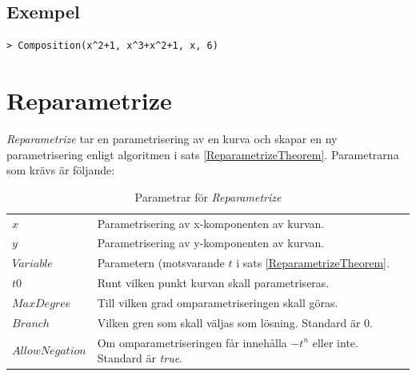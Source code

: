 \subsection{Exempel}

\begin{maplegroup}
\begin{verbatim}
> Composition(x^2+1, x^3+x^2+1, x, 6)
\end{verbatim}
\mapleresult
\begin{maplelatex}
\end{maplelatex}
\end{maplegroup}

\section{Reparametrize}

\emph{Reparametrize} tar en parametrisering av en kurva och skapar en ny parametrisering enligt algoritmen i sats \ref{ReparametrizeTheorem}. Parametrarna som krävs är följande:

\begin{table}[h]
\caption{Parametrar för \emph{Reparametrize}}
\begin{center}
\begin{tabular}{|l|p{9cm}|}
\hline
$x$ & Parametrisering av x-komponenten av kurvan. \\
$y$ & Parametrisering av y-komponenten av kurvan. \\
$Variable$ & Parametern (motsvarande $t$ i sats \ref{ReparametrizeTheorem}.\\
$t0$ & Runt vilken punkt kurvan skall parametriseras.\\
$MaxDegree$ & Till vilken grad omparametriseringen skall göras.\\
$Branch$ & Vilken gren som skall väljas som lösning. Standard är $0$.\\
$AllowNegation$ & Om omparametriseringen får innehålla $-t^n$ eller inte. Standard är \emph{true}.\\
\hline
\end{tabular}
\end{center}
\end{table}

